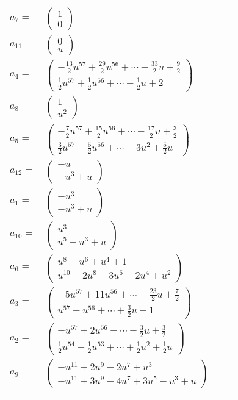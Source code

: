 \documentclass[1p]{elsarticle_modified}
\theoremstyle{definition}
\begin{document}
\begin{tabular}{m{7pt} m{180pt} m{7pt} m{180pt} }
\flushright $a_{7}=$&$\begin{pmatrix}1\\0\end{pmatrix}$ \\
\flushright $a_{11}=$&$\begin{pmatrix}0\\u\end{pmatrix}$ \\
\flushright $a_{4}=$&$\begin{pmatrix}-\frac{13}{2} u^{57}+\frac{29}{2} u^{56}+\cdots-\frac{33}{2} u+\frac{9}{2}\\\frac{1}{2} u^{57}+\frac{1}{2} u^{56}+\cdots-\frac{1}{2} u+2\end{pmatrix}$ \\
\flushright $a_{8}=$&$\begin{pmatrix}1\\u^2\end{pmatrix}$ \\
\flushright $a_{5}=$&$\begin{pmatrix}-\frac{7}{2} u^{57}+\frac{15}{2} u^{56}+\cdots-\frac{17}{2} u+\frac{3}{2}\\\frac{3}{2} u^{57}-\frac{5}{2} u^{56}+\cdots-3 u^2+\frac{5}{2} u\end{pmatrix}$ \\
\flushright $a_{12}=$&$\begin{pmatrix}- u\\- u^3+u\end{pmatrix}$ \\
\flushright $a_{1}=$&$\begin{pmatrix}- u^3\\- u^3+u\end{pmatrix}$ \\
\flushright $a_{10}=$&$\begin{pmatrix}u^3\\u^5- u^3+u\end{pmatrix}$ \\
\flushright $a_{6}=$&$\begin{pmatrix}u^8- u^6+u^4+1\\u^{10}-2 u^8+3 u^6-2 u^4+u^2\end{pmatrix}$ \\
\flushright $a_{3}=$&$\begin{pmatrix}-5 u^{57}+11 u^{56}+\cdots-\frac{23}{2} u+\frac{7}{2}\\u^{57}- u^{56}+\cdots+\frac{3}{2} u+1\end{pmatrix}$ \\
\flushright $a_{2}=$&$\begin{pmatrix}- u^{57}+2 u^{56}+\cdots-\frac{3}{2} u+\frac{3}{2}\\\frac{1}{2} u^{54}-\frac{1}{2} u^{53}+\cdots+\frac{1}{2} u^2+\frac{1}{2} u\end{pmatrix}$ \\
\flushright $a_{9}=$&$\begin{pmatrix}- u^{11}+2 u^9-2 u^7+u^3\\- u^{11}+3 u^9-4 u^7+3 u^5- u^3+u\end{pmatrix}$\\&\end{tabular}
\end{document}
